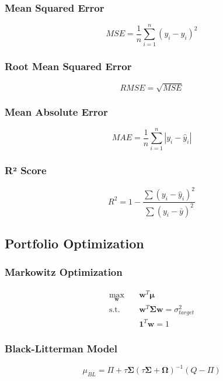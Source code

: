 \documentclass[11pt,letterpaper]{book}
\begin{document}
\subsubsection{Mean Squared Error}
\begin{equation}
MSE = \frac{1}{n} \sum_{i=1}^n (y_i - \hat{y}_i)^2
\end{equation}

\subsubsection{Root Mean Squared Error}
\begin{equation}
RMSE = \sqrt{MSE}
\end{equation}

\subsubsection{Mean Absolute Error}
\begin{equation}
MAE = \frac{1}{n} \sum_{i=1}^n |y_i - \hat{y}_i|
\end{equation}

\subsubsection{R² Score}
\begin{equation}
R^2 = 1 - \frac{\sum (y_i - \hat{y}_i)^2}{\sum (y_i - \bar{y})^2}
\end{equation}

\subsection{Portfolio Optimization}

\subsubsection{Markowitz Optimization}
\begin{align}
\max_{\mathbf{w}} \quad & \mathbf{w}^T \boldsymbol{\mu} \\
\text{s.t.} \quad & \mathbf{w}^T \boldsymbol{\Sigma} \mathbf{w} = \sigma_{target}^2 \\
& \mathbf{1}^T \mathbf{w} = 1
\end{align}

\subsubsection{Black-Litterman Model}
\begin{equation}
\mu_{BL} = \Pi + \tau \boldsymbol{\Sigma} (\tau \boldsymbol{\Sigma} + \boldsymbol{\Omega})^{-1} (Q - \Pi)
\end{equation}
\end{document}
